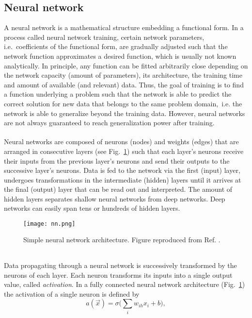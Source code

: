 \documentclass[../../main.tex]{subfiles}
\begin{document}
\subsection{Neural network}\label{sec:nn}
A neural network is a mathematical structure embedding a functional form. In a process called neural network training, certain network parameters, i.e.~coefficients of the functional form, are gradually adjusted such that the network function approximates a desired function, which is usually not known analytically. In principle, any function can be fitted arbitrarily close \cite{nielsen15} depending on the network capacity (amount of parameters), its architecture, the training time and amount of available (and relevant) data. Thus, the goal of training is to find a function underlying a problem such that the network is able to predict the correct solution for new data that belongs to the same problem domain,~i.e. the network is able to generalize beyond the training data. However, neural networks are not always guaranteed to reach generalization power after training.\\
\\
Neural networks are composed of neurons (nodes) and weights (edges) that are arranged in consecutive layers (see Fig.~\ref{fig:schema_nn}) such that each layer's neurons receive their inputs from the previous layer's neurons and send their outputs to the successive layer's neurons. Data is fed to the network via the first (input) layer, undergoes transformations in the intermediate (hidden) layers until it arrives at the final (output) layer that can be read out and interpreted. The amount of hidden layers separates shallow neural networks from deep networks. Deep networks can easily span tens or hundreds \cite{fcholet17} of hidden layers.\\
\begin{figure}[htp]
	\begin{center}
		\texttt{[image: nn.png]}
		\caption{Simple neural network architecture. Figure reproduced from Ref. \cite{jahr15}.}
		\label{fig:schema_nn}
	\end{center}
\end{figure}
\\
Data propagating through a neural network is successively transformed by the neurons of each layer. Each neuron transforms its inputs into a single output value, called \textit{activation}. In a fully connected neural network architecture (Fig.~\ref{fig:schema_nn}) the activation of a single neuron is defined by
\begin{equation}
	a(\vec{x}) = \sigma\bigg(\sum_i{w_{ih}x_i}+b\bigg),
	\label{eq:single_activation}
\end{equation}
\end{document}
